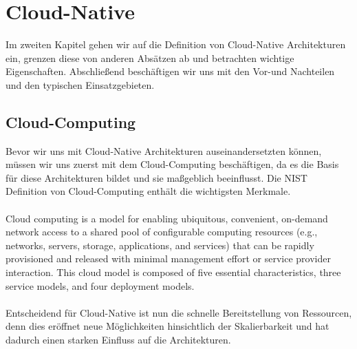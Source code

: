 \chapter{Cloud-Native}

Im zweiten Kapitel gehen wir auf die Definition von Cloud-Native Architekturen ein, grenzen diese von anderen Absätzen ab und betrachten wichtige Eigenschaften. Abschließend beschäftigen wir uns mit den Vor-und Nachteilen und den typischen Einsatzgebieten.

\section{Cloud-Computing}
Bevor wir uns mit Cloud-Native Architekturen auseinandersetzten können, müssen wir uns zuerst mit dem Cloud-Computing beschäftigen, da es die Basis für diese Architekturen bildet und sie maßgeblich beeinflusst. Die \ac{NIST} Definition von Cloud-Computing enthält die wichtigsten Merkmale.\\
\\
\glqq Cloud computing is a model for enabling ubiquitous, convenient, on-demand network access to a shared pool of configurable computing resources (e.g., networks, servers, storage, applications, and services) that can be rapidly provisioned and released with minimal management effort or service provider interaction. This cloud model is composed of five essential characteristics, three service models, and four deployment models.\grqq{} \cite{Nist}\\
\\
Entscheidend für Cloud-Native ist nun die schnelle Bereitstellung von Ressourcen, denn dies eröffnet neue Möglichkeiten hinsichtlich der Skalierbarkeit und hat dadurch einen starken Einfluss auf die Architekturen.

